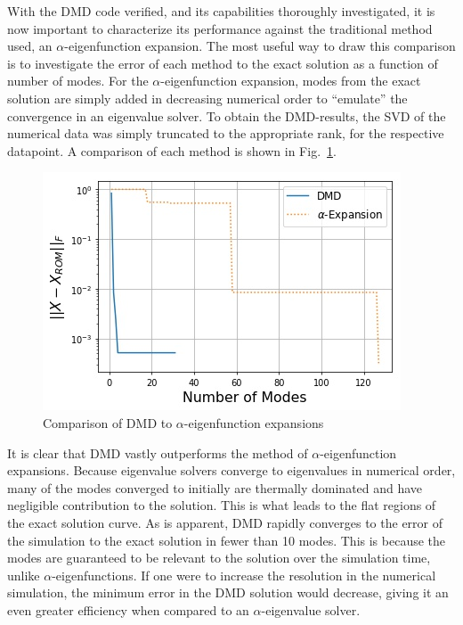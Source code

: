 \documentclass{style/nseJournal}
\newcommand{\LFI}[1]{\label{fi:#1}}
\newcommand{\FI}[1]{Fig.~\ref{fi:#1}}
\newcommand{\bfg}{\begin{figure}}
\newcommand{\efg}{\end{figure}}
\begin{document}
With the DMD code verified, and its capabilities thoroughly investigated, it is now important to characterize its performance against the traditional method used, an $\alpha$-eigenfunction expansion.  
The most useful way to draw this comparison is to investigate the error of each method to the exact solution as a function of number of modes.  
For the $\alpha$-eigenfunction expansion, modes from the exact solution are simply added in decreasing numerical order to ``emulate'' the convergence in an eigenvalue solver.  
To obtain the DMD-results, the SVD of the numerical data was simply truncated to the appropriate rank, for the respective datapoint.  
A comparison of each method is shown in \FI{comp}.  
\bfg[!htb] \centering
\includegraphics[scale=0.5]{figures/method_comparison.jpg}
	\caption{Comparison of DMD to $\alpha$-eigenfunction expansions}
	\LFI{comp}
\efg

It is clear that DMD vastly outperforms the method of $\alpha$-eigenfunction expansions.  
Because eigenvalue solvers converge to eigenvalues in numerical order, many of the modes converged to initially are thermally dominated and have negligible contribution to the solution.  
This is what leads to the flat regions of the exact solution curve.  
As is apparent, DMD rapidly converges to the error of the simulation to the exact solution in fewer than 10 modes.  
This is because the modes are guaranteed to be relevant to the solution over the simulation time, unlike $\alpha$-eigenfunctions.  
If one were to increase the resolution in the numerical simulation, the minimum error in the DMD solution would decrease, giving it an even greater efficiency when compared to an $\alpha$-eigenvalue solver.  
\end{document}
